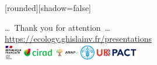\documentclass[10pt,table,dvipsnames,compress]{beamer}
\begin{document}
{
  [rounded][shadow=false]
  \begin{frame}[plain]
    \begin{block}{}
      \begin{center}
        \ldots~Thank you for attention~\ldots \\
        \url{https://ecology.ghislainv.fr/presentations} \\
        \includegraphics[width=0.45\textwidth]{figs/partners_logos}
      \end{center}
    \end{block}
  \end{frame}
}
\end{document}
